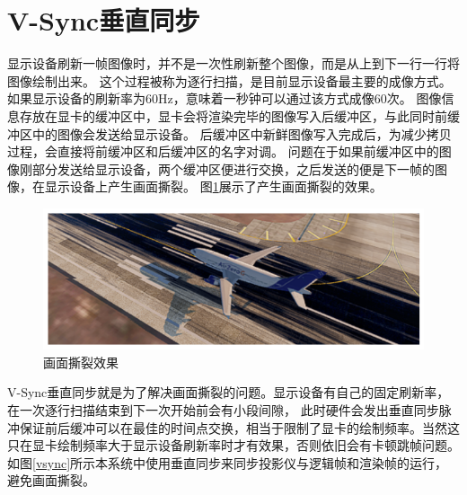 \section{V-Sync垂直同步}
显示设备刷新一帧图像时，并不是一次性刷新整个图像，而是从上到下一行一行将图像绘制出来。
这个过程被称为逐行扫描，是目前显示设备最主要的成像方式。如果显示设备的刷新率为60Hz，意味着一秒钟可以通过该方式成像60次。
图像信息存放在显卡的缓冲区中，显卡会将渲染完毕的图像写入后缓冲区，与此同时前缓冲区中的图像会发送给显示设备。
后缓冲区中新鲜图像写入完成后，为减少拷贝过程，会直接将前缓冲区和后缓冲区的名字对调\cite{vsync1}。
问题在于如果前缓冲区中的图像刚部分发送给显示设备，两个缓冲区便进行交换，之后发送的便是下一帧的图像，在显示设备上产生画面撕裂。
图\ref{showtear}展示了产生画面撕裂的效果。
\begin{figure}[h!]
    \begin{center}
        \includegraphics[width=\textwidth]{pictures/showtear.png}
        \caption{画面撕裂效果}
        \label{showtear}
    \end{center}
\end{figure}
\par
V-Sync垂直同步就是为了解决画面撕裂的问题。显示设备有自己的固定刷新率，在一次逐行扫描结束到下一次开始前会有小段间隙，
此时硬件会发出垂直同步脉冲保证前后缓冲可以在最佳的时间点交换\cite{vsync2}，相当于限制了显卡的绘制频率。当然这只在显卡绘制频率大于显示设备刷新率时才有效果，否则依旧会有卡顿跳帧问题。
如图\ref{vsync}所示本系统中使用垂直同步来同步投影仪与逻辑帧和渲染帧的运行，避免画面撕裂。
